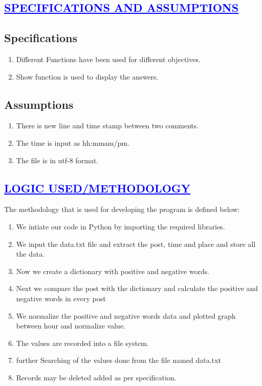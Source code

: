 \documentclass[a4paper,12pt]{report}
\begin{document}
\begin{center}
\chapter{\textcolor{blue}{\underline {SPECIFICATIONS AND ASSUMPTIONS}}}
\end{center}
\section*{Specifications}

\begin{enumerate}
\item Different Functions have been used for different objectives.
\item Show function is used to display the answers.


\end{enumerate}

\section*{Assumptions}

\begin{enumerate}
\item There is new line and time stamp between two comments.

\item The time is input as hh:mmam/pm.
\item The file is in utf-8 format.

\end{enumerate}
 
\begin{center}
\chapter{\textcolor{blue}{\underline {LOGIC USED/METHODOLOGY}}}
\end{center}
The methodology that is used for developing the program is defined below:\\

\begin{enumerate}
\item We intiate our code in Python by importing the required libraries.
\item We input the data.txt file and extract the post, time and place and store all the data.
\item Now we create a dictionary with positive and negative words.

\item Next we compare the post with the dictionary and calculate the positive and negative words in every post
\item We normalize the positive and negative words data and plotted graph between hour and normalize value.
\item The values are recorded into a file system.
\item further Searching of the values done from the file named data.txt
\item Records may be deleted added as per specification.

\end{enumerate}
\end{document}
